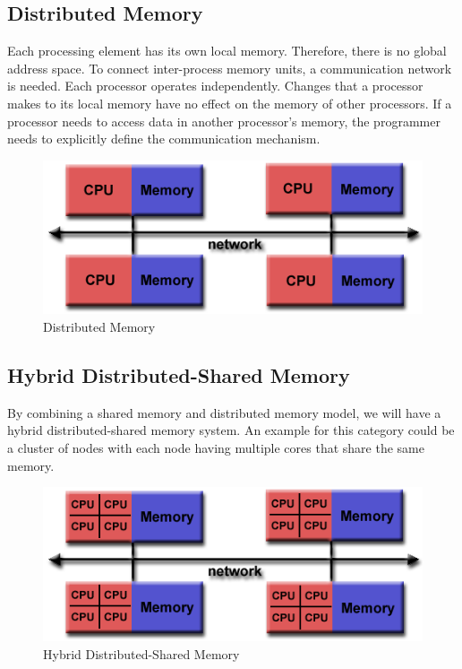 \subsection{Distributed Memory}
Each processing element has its own local memory. Therefore, there is no global address space. To connect inter-process memory units, a communication network is needed.
Each processor operates independently. Changes that a processor makes to its local memory have no effect on the memory of other processors. If a processor needs to access data in another processor's memory, the programmer needs to explicitly define the communication mechanism.

\begin{figure}[h!]
  \centering
  \includegraphics[scale=0.6]{images/distributed_mem.png}
  \caption{Distributed Memory}
  \label{fig:distributed_mem}
\end{figure}


\subsection{Hybrid Distributed-Shared Memory}
By combining a shared memory and distributed memory model, we will have a hybrid distributed-shared memory system. An example for this category could be a cluster of nodes with each node having multiple cores that share the same memory.

\begin{figure}[h!]
  \centering
  \includegraphics[scale=0.6]{images/hybrid_mem.png}
  \caption{Hybrid Distributed-Shared Memory}
  \label{fig:hybridd_mem}
\end{figure}



